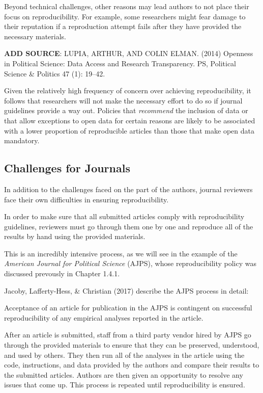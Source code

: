 \documentclass[12pt,twoside]{reedthesis}
\begin{document}
Beyond technical challenges, other reasons may lead authors to not place
their focus on reproducibility. For example, some researchers might fear
damage to their reputation if a reproduction attempt fails after they
have provided the necessary materials.

\textbf{ADD SOURCE}: LUPIA, ARTHUR, AND COLIN ELMAN. (2014) Openness in
Political Science: Data Access and Research Transparency. PS, Political
Science \& Politics 47 (1): 19--42.

Given the relatively high frequency of concern over achieving
reproducibility, it follows that researchers will not make the necessary
effort to do so if journal guidelines provide a way out. Policies that
\emph{recommend} the inclusion of data or that allow exceptions to open
data for certain reasons are likely to be associated with a lower
proportion of reproducible articles than those that make open data
mandatory.

\subsection{Challenges for Journals}\label{challenges-for-journals}

In addition to the challenges faced on the part of the authors, journal
reviewers face their own difficulties in ensuring reproducibility.

In order to make sure that all submitted articles comply with
reproducibility guidelines, reviewers must go through them one by one
and reproduce all of the results by hand using the provided materials.

This is an incredibly intensive process, as we will see in the example
of the \emph{American Journal for Political Science} (AJPS), whose
reproducibility policy was discussed prevously in Chapter 1.4.1.

Jacoby, Lafferty-Hess, \& Christian (2017) describe the AJPS process in
detail:

Acceptance of an article for publication in the AJPS is contingent on
successful reproducibility of any empirical analyses reported in the
article.

After an article is submitted, staff from a third party vendor hired by
AJPS go through the provided materials to ensure that they can be
preserved, understood, and used by others. They then run all of the
analyses in the article using the code, instructions, and data provided
by the authors and compare their results to the submitted articles.
Authors are then given an opportunity to resolve any issues that come
up. This process is repeated until reproducibility is ensured.
\end{document}
